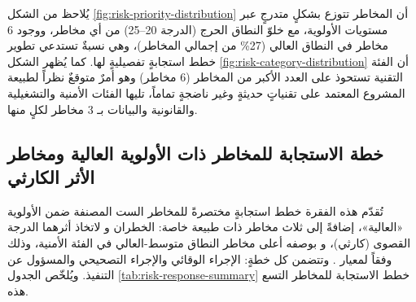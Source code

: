 يُلاحظ من الشكل \ref{fig:risk-priority-distribution} أن المخاطر تتوزع بشكلٍ متدرجٍ عبر مستويات الأولوية، مع خلوّ النطاق الحرج (الدرجة 20--25) من أي مخاطر، ووجود 6 مخاطر في النطاق العالي (27\% من إجمالي المخاطر)، وهي نسبةٌ تستدعي تطوير خطط استجابةٍ تفصيليةٍ لها. كما يُظهر الشكل \ref{fig:risk-category-distribution} أن الفئة التقنية تستحوذ على العدد الأكبر من المخاطر (6 مخاطر) وهو أمرٌ متوقعٌ نظراً لطبيعة المشروع المعتمد على تقنياتٍ حديثةٍ وغير ناضجةٍ تماماً، تليها الفئات الأمنية والتشغيلية والقانونية والبيانات بـ 3 مخاطر لكلٍ منها.


\subsection{خطة الاستجابة للمخاطر ذات الأولوية العالية ومخاطر الأثر الكارثي}
\label{subsec:risk-response-plans}

تُقدّم هذه الفقرة خطط استجابةٍ مختصرةً للمخاطر الست المصنفة ضمن الأولوية «العالية»، إضافةً إلى ثلاث مخاطر ذات طبيعة خاصة: الخطران  و لاتخاذ أثرهما الدرجة القصوى (كارثي)، و بوصفه أعلى مخاطر النطاق متوسط-العالي في الفئة الأمنية، وذلك وفقاً لمعيار  \cite{iso31000}. وتتضمن كل خطةٍ: الإجراء الوقائي والإجراء التصحيحي والمسؤول عن التنفيذ. ويُلخّص الجدول \ref{tab:risk-response-summary} خطط الاستجابة للمخاطر التسع هذه.

